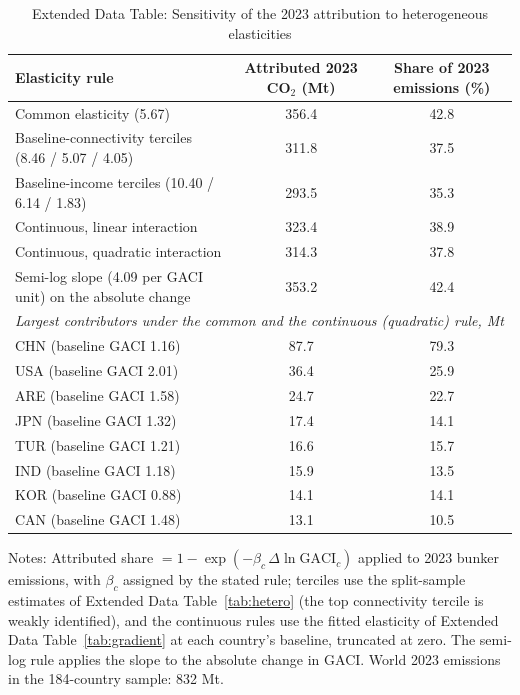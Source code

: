 \begin{table}[htbp]
\centering
\begin{threeparttable}
\caption{Extended Data Table: Sensitivity of the 2023 attribution to heterogeneous elasticities}
\label{tab:attr_sens}
\footnotesize
\begin{tabular}{lcc}
\toprule
Elasticity rule & Attributed 2023 CO$_2$ (Mt) & Share of 2023 emissions (\%) \\
\midrule
  Common elasticity (5.67) & 356.4 & 42.8 \\
  Baseline-connectivity terciles (8.46 / 5.07 / 4.05) & 311.8 & 37.5 \\
  Baseline-income terciles (10.40 / 6.14 / 1.83) & 293.5 & 35.3 \\
  Continuous, linear interaction & 323.4 & 38.9 \\
  Continuous, quadratic interaction & 314.3 & 37.8 \\
  Semi-log slope (4.09 per GACI unit) on the absolute change & 353.2 & 42.4 \\
\midrule
\multicolumn{3}{l}{\textit{Largest contributors under the common and the continuous (quadratic) rule, Mt}} \\
  CHN (baseline GACI 1.16) & 87.7 & 79.3 \\
  USA (baseline GACI 2.01) & 36.4 & 25.9 \\
  ARE (baseline GACI 1.58) & 24.7 & 22.7 \\
  JPN (baseline GACI 1.32) & 17.4 & 14.1 \\
  TUR (baseline GACI 1.21) & 16.6 & 15.7 \\
  IND (baseline GACI 1.18) & 15.9 & 13.5 \\
  KOR (baseline GACI 0.88) & 14.1 & 14.1 \\
  CAN (baseline GACI 1.48) & 13.1 & 10.5 \\
\bottomrule
\end{tabular}
\begin{tablenotes}[flushleft]
\footnotesize
\item Notes: Attributed share $= 1-\exp(-\beta_c\,\Delta\ln\mathrm{GACI}_c)$ applied to 2023 bunker emissions, with $\beta_c$ assigned by the stated rule; terciles use the split-sample estimates of Extended Data Table~\ref{tab:hetero} (the top connectivity tercile is weakly identified), and the continuous rules use the fitted elasticity of Extended Data Table~\ref{tab:gradient} at each country's baseline, truncated at zero. The semi-log rule applies the slope to the absolute change in GACI. World 2023 emissions in the 184-country sample: 832 Mt.
\end{tablenotes}
\end{threeparttable}
\end{table}

